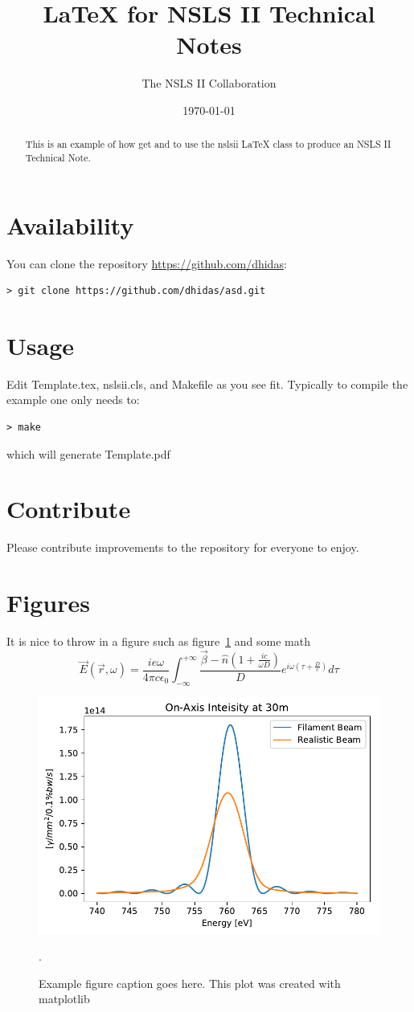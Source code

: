\documentclass{nslsii}
\title{\LaTeX{}  for NSLS II Technical Notes}
\author{The NSLS II Collaboration}
\date{\today}
\begin{document}
\maketitle

\begin{abstract}
This is an example of how get and to use the nslsii \LaTeX{} class to produce an NSLS II Technical Note.
\end{abstract}



\section{Availability}
You can clone the repository \href{https://github.com/dhidas}{https://github.com/dhidas}:
\begin{verbatim}
> git clone https://github.com/dhidas/asd.git
\end{verbatim}

\section{Usage}
Edit Template.tex, nslsii.cls, and Makefile as you see fit.  Typically to compile the example one only needs to:
\begin{verbatim}
> make
\end{verbatim}
which will generate Template.pdf

\section{Contribute}
Please contribute improvements to the repository for everyone to enjoy.


\section{Figures}
It is nice to throw in a figure such as figure~\ref{fig:example} and some math
$$
\vec E(\vec r, \omega) = \frac{ie\omega}{4 \pi c \epsilon_0} \int_{-\infty}^{+\infty} \frac{\vec \beta - \hat n (1 + \frac{i c}{ \omega D})}{D} e^{i \omega ( \tau + \frac{D}{c} )} d\tau
$$

\begin{figure}
\centering
\includegraphics[width=0.5\columnwidth]{img/spectra}
\caption{Example figure caption goes here.  This plot was created with matplotlib~\cite{bib:matplotlib}}.
\label{fig:example}
\end{figure}
\end{document}
